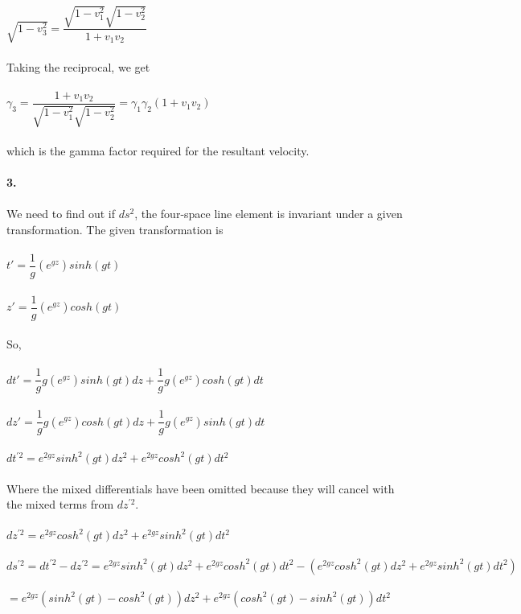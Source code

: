 \documentclass[prb,preprint]
{revtex4-1}
\newcommand{\PRLsep}{\noindent\makebox[\linewidth]{\resizebox{0.8888\linewidth}{2pt}{$\bullet$}}\bigskip}
\begin{document}
$\sqrt{1 - v_3^2} = \dfrac{\sqrt{1-v_1^2}\sqrt{1-v_2^2}}{1+ v_1 v_2}$
\\
\\
Taking the reciprocal, we get 
\\
\\
$\gamma_3 = \dfrac{1+ v_1 v_2}{\sqrt{1-v_1^2}\sqrt{1-v_2^2}} = \gamma_1 \gamma_2 \left(1+ v_1 v_2\right)$
\\
\\
which is the gamma factor required for the resultant velocity.
\\
\PRLsep
\\
\textbf{3.}
\\
\\
We need to find out if $ds^2$, the four-space line element is invariant under a given transformation.
The given transformation is 
\\
\\
$t' = \dfrac{1}{g}\left(e^{gz}\right)sinh\left(gt\right)$
\\
\\
$z' = \dfrac{1}{g}\left(e^{gz}\right)cosh\left(gt\right)$
\\
\\
So,
\\
\\
$dt' = \dfrac{1}{g}g\left(e^{gz}\right)sinh\left(gt\right)dz + \dfrac{1}{g}g\left(e^{gz}\right)cosh\left(gt\right)dt$
\\
\\
$dz' = \dfrac{1}{g}g\left(e^{gz}\right)cosh\left(gt\right)dz + \dfrac{1}{g}g\left(e^{gz}\right)sinh\left(gt\right)dt$
\\
\\
$dt^{\prime 2} = e^{2gz}sinh^2\left(gt\right)dz^2 + e^{2gz}cosh^2\left(gt\right)dt^2$
\\
\\
Where the mixed differentials have been omitted because they will cancel with the mixed terms from $dz^{\prime 2}$.
\\
\\
$dz^{\prime 2} = e^{2gz}cosh^2\left(gt\right)dz^2 + e^{2gz}sinh^2\left(gt\right)dt^2$
\\
\\
$ds^{\prime 2} = dt^{\prime 2} - dz^{\prime 2} = e^{2gz}sinh^2\left(gt\right)dz^2 + e^{2gz}cosh^2\left(gt\right)dt^2 - \left(e^{2gz}cosh^2\left(gt\right)dz^2 + e^{2gz}sinh^2\left(gt\right)dt^2\right)$
\\
\\
$= e^{2gz}\left(sinh^2\left(gt\right) - cosh^2\left(gt\right)\right)dz^2 + e^{2gz}\left(cosh^2\left(gt\right) - sinh^2\left(gt\right)\right)dt^2$
\end{document}
